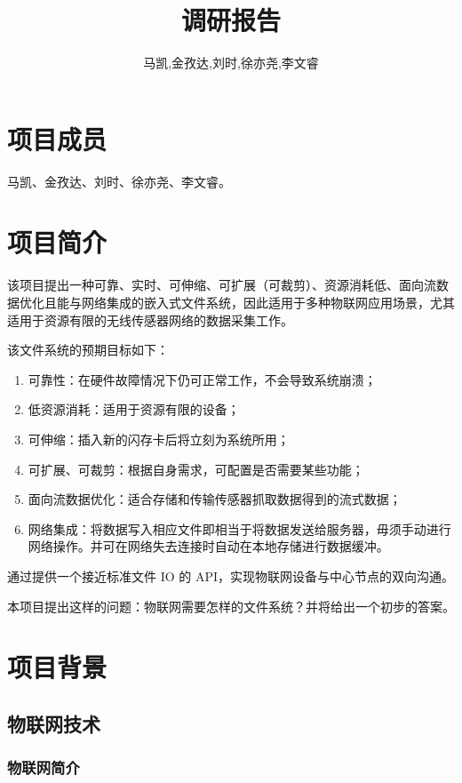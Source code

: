 \documentclass{ctexart}
\begin{document}
\title{调研报告}
\author{马凯,金孜达,刘时,徐亦尧,李文睿}
\setcounter{tocdepth}{2}
\maketitle
\tableofcontents
\newpage

\section{项目成员}

马凯、金孜达、刘时、徐亦尧、李文睿。

\section{项目简介}

该项目提出一种可靠、实时、可伸缩、可扩展（可裁剪）、资源消耗低、面向流数据优化且能与网络集成的嵌入式文件系统，因此适用于多种物联网应用场景，尤其适用于资源有限的无线传感器网络的数据采集工作。

该文件系统的预期目标如下：
\begin{enumerate}
	\item 可靠性：在硬件故障情况下仍可正常工作，不会导致系统崩溃；
	\item 低资源消耗：适用于资源有限的设备；
	\item 可伸缩：插入新的闪存卡后将立刻为系统所用；
	\item 可扩展、可裁剪：根据自身需求，可配置是否需要某些功能；
	\item 面向流数据优化：适合存储和传输传感器抓取数据得到的流式数据；
	\item 网络集成：将数据写入相应文件即相当于将数据发送给服务器，毋须手动进行网络操作。并可在网络失去连接时自动在本地存储进行数据缓冲。
\end{enumerate}

通过提供一个接近标准文件 IO 的 API，实现物联网设备与中心节点的双向沟通。

本项目提出这样的问题：物联网需要怎样的文件系统？并将给出一个初步的答案。

\section{项目背景}

\subsection{物联网技术}

\subsubsection{物联网简介}
\end{document}
